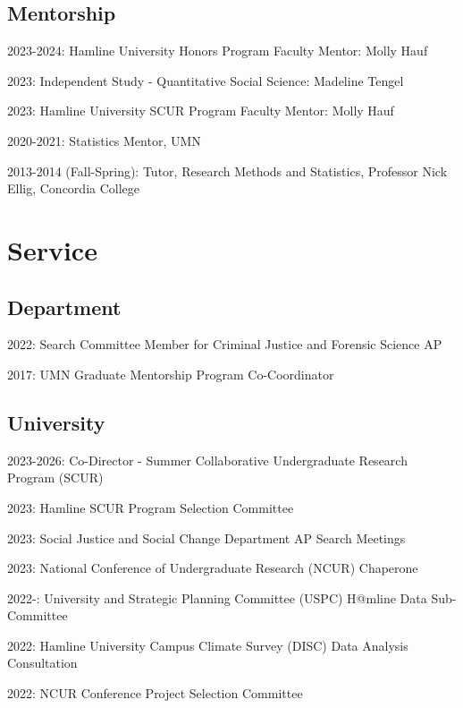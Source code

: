 \documentclass[letterpaper]{article}
\renewenvironment{itemize}{
  \begin{list}{}{
    \setlength{\leftmargin}{1.5em}
  }
}{
  \end{list}
}
\begin{document}
\subsection*{Mentorship}
        \begin{itemize}

\item 2023-2024: Hamline University Honors Program Faculty Mentor: Molly Hauf
\item 2023: Independent Study - Quantitative Social Science: Madeline Tengel 
\item 2023: Hamline University SCUR Program Faculty Mentor: Molly Hauf
\item 2020-2021: Statistics Mentor, UMN
    

\item 2013-2014 (Fall-Spring): Tutor, Research Methods and Statistics, Professor Nick Ellig, Concordia College
         \end{itemize}



\section*{\textbf{Service}}

\subsection*{Department}
\begin{itemize}

\item 2022: Search Committee Member for Criminal Justice and Forensic Science AP
\item 2017: UMN Graduate Mentorship Program Co-Coordinator

\end{itemize}

\subsection*{University}
\begin{itemize}
\item 2023-2026: Co-Director - Summer Collaborative Undergraduate Research Program (SCUR)
\item 2023: Hamline SCUR Program Selection Committee
\item 2023: Social Justice and Social Change Department AP Search Meetings
\item 2023: National Conference of Undergraduate Research (NCUR) Chaperone
\item 2022-: University and Strategic Planning Committee (USPC) H@mline Data Sub-Committee
\item 2022: Hamline University Campus Climate Survey (DISC) Data Analysis Consultation
\item 2022: NCUR Conference Project Selection Committee
\end{itemize}
\end{document}
